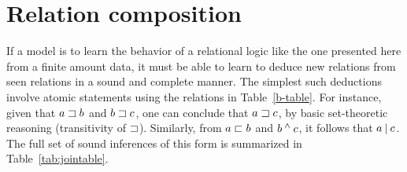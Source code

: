 \section{Relation composition}

If a model is to learn the behavior of a relational logic like the one
presented here from a finite amount data, it must be able to learn to
deduce new relations from seen relations in a sound and complete
manner. The simplest such deductions involve atomic statements using
the relations in Table~\ref{b-table}. For instance, given that $a
\sqsupset b$ and $b \sqsupset c$, one can conclude that $a \sqsupset c$, by
basic set-theoretic reasoning (transitivity of $\sqsupset$). Similarly,
from $a \sqsubset b$ and $b \mathbin{^{\wedge}} c$, it follows that $a \mathbin{|} c$.
The full set of sound inferences of this form is summarized in
Table~\ref{tab:jointable}.


